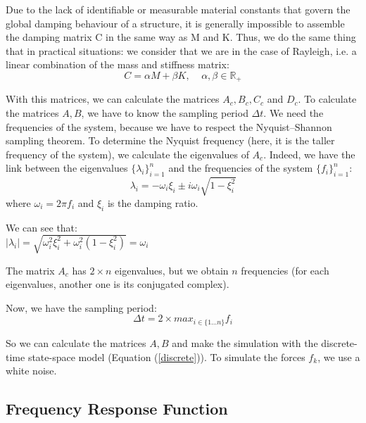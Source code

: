 \documentclass[journal]{IEEEtran}
\begin{document}
Due to the lack of identifiable or measurable material
constants that govern the global damping behaviour of a structure, it is generally
impossible to assemble the damping matrix C in the same way as M and K.
Thus, we do the same thing that in practical situations: we consider that we are in the case of Rayleigh, i.e. a linear combination of the mass and stiffness matrix:
\begin{equation}
C = \alpha M + \beta K,\ \ \ \ \ \alpha, \beta \in \mathbb{R}_+
\end{equation}

With this matrices, we can calculate the matrices $A_c, B_c, C_c$ and $D_c$. To calculate the matrices $A, B$, we have to know the 
sampling period $\Delta t$. We need the frequencies of the system, because we have to respect the Nyquist–Shannon sampling theorem.
To determine the Nyquist frequency (here, it is the taller frequency of the system), we calculate the eigenvalues of $A_c$. Indeed, we have the link between the eigenvalues $\{\lambda_i\}_{i=1}^n$ and the frequencies of the system $\{f_i\}_{i=1}^n$:
\begin{equation}
\lambda_i = - \omega_i \xi_i \pm i \omega_i \sqrt{1 - \xi_i^2}
\end{equation}
where $\omega_i = 2 \pi f_i$ and $\xi_i$ is the damping ratio.

\begin{remark}
We can see that:\\
$|\lambda_i| = \sqrt{\omega_i^2 \xi_i^2 + \omega_i^2 (1 - \xi_i^2)} = \omega_i$
\end{remark}

\begin{remark}
The matrix $A_c$ has $2 \times n$ eigenvalues, but we obtain $n$ frequencies (for each eigenvalues, another one is its conjugated complex). 
\end{remark}

Now, we have the sampling period:
\begin{equation}
\Delta t = 2 \times max_{i \in \{1 ... n\} } f_i
\end{equation}

So we can calculate the matrices $A, B$ and make the simulation with the discrete-time state-space model (Equation (\ref{discrete})). To simulate the forces $f_k$, we use a white noise.

\subsection{Frequency Response Function}
\end{document}
